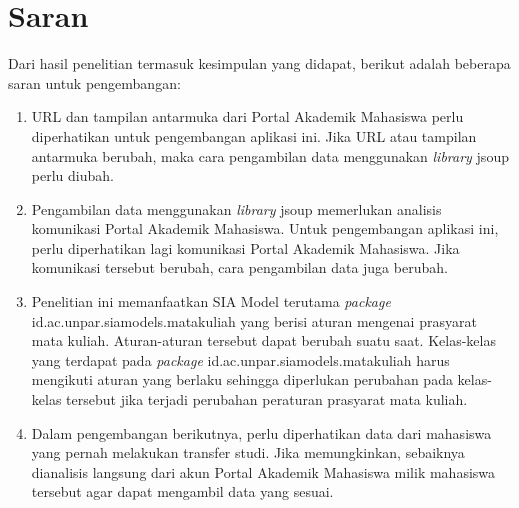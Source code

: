 \section{Saran}
\label{sec:saran}
Dari hasil penelitian termasuk kesimpulan yang didapat, berikut adalah beberapa saran untuk pengembangan:
	\begin{enumerate}
		\item URL dan tampilan antarmuka dari Portal Akademik Mahasiswa perlu diperhatikan untuk pengembangan aplikasi ini. Jika URL atau tampilan antarmuka berubah, maka cara pengambilan data menggunakan \textit{library} jsoup perlu diubah.
		\item Pengambilan data menggunakan \textit{library} jsoup memerlukan analisis komunikasi Portal Akademik Mahasiswa. Untuk pengembangan aplikasi ini, perlu diperhatikan lagi komunikasi Portal Akademik Mahasiswa. Jika komunikasi tersebut berubah, cara pengambilan data juga berubah.
		\item Penelitian ini memanfaatkan SIA Model terutama \textit{package} id.ac.unpar.siamodels.matakuliah yang berisi aturan mengenai prasyarat mata kuliah. Aturan-aturan tersebut dapat berubah suatu saat. Kelas-kelas yang terdapat pada \textit{package} id.ac.unpar.siamodels.matakuliah harus mengikuti aturan yang berlaku sehingga diperlukan perubahan pada kelas-kelas tersebut jika terjadi perubahan peraturan prasyarat mata kuliah.
		\item Dalam pengembangan berikutnya, perlu diperhatikan data dari mahasiswa yang pernah melakukan transfer studi. Jika memungkinkan, sebaiknya dianalisis langsung dari akun Portal Akademik Mahasiswa milik mahasiswa tersebut agar dapat mengambil data yang sesuai.
	\end{enumerate}